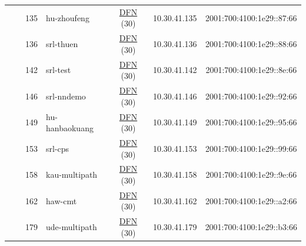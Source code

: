 \begin{small}
\begin{center}
\begin{longtable}{|c|c|c|c|c|c|c|c|}
  &  & \tiny{135} & \multicolumn{1}{|l|}{\tiny{hu-zhoufeng}} & \multicolumn{2}{|c|}{\tiny{\href{https://www.dfn.de}{DFN} (30)}} & \tiny{10.30.41.135} & \tiny{2001:700:4100:1e29::87:66} \\* \cline{3-3}\cline{4-4}\cline{5-5}\cline{6-6}\cline{7-7}\cline{8-8}
  &  & \tiny{136} & \multicolumn{1}{|l|}{\tiny{srl-thuen}} & \multicolumn{2}{|c|}{\tiny{\href{https://www.dfn.de}{DFN} (30)}} & \tiny{10.30.41.136} & \tiny{2001:700:4100:1e29::88:66} \\* \cline{3-3}\cline{4-4}\cline{5-5}\cline{6-6}\cline{7-7}\cline{8-8}
  &  & \tiny{142} & \multicolumn{1}{|l|}{\tiny{srl-test}} & \multicolumn{2}{|c|}{\tiny{\href{https://www.dfn.de}{DFN} (30)}} & \tiny{10.30.41.142} & \tiny{2001:700:4100:1e29::8e:66} \\* \cline{3-3}\cline{4-4}\cline{5-5}\cline{6-6}\cline{7-7}\cline{8-8}
  &  & \tiny{146} & \multicolumn{1}{|l|}{\tiny{srl-nndemo}} & \multicolumn{2}{|c|}{\tiny{\href{https://www.dfn.de}{DFN} (30)}} & \tiny{10.30.41.146} & \tiny{2001:700:4100:1e29::92:66} \\* \cline{3-3}\cline{4-4}\cline{5-5}\cline{6-6}\cline{7-7}\cline{8-8}
  &  & \tiny{149} & \multicolumn{1}{|l|}{\tiny{hu-hanbaokuang}} & \multicolumn{2}{|c|}{\tiny{\href{https://www.dfn.de}{DFN} (30)}} & \tiny{10.30.41.149} & \tiny{2001:700:4100:1e29::95:66} \\* \cline{3-3}\cline{4-4}\cline{5-5}\cline{6-6}\cline{7-7}\cline{8-8}
  &  & \tiny{153} & \multicolumn{1}{|l|}{\tiny{srl-cps}} & \multicolumn{2}{|c|}{\tiny{\href{https://www.dfn.de}{DFN} (30)}} & \tiny{10.30.41.153} & \tiny{2001:700:4100:1e29::99:66} \\* \cline{3-3}\cline{4-4}\cline{5-5}\cline{6-6}\cline{7-7}\cline{8-8}
  &  & \tiny{158} & \multicolumn{1}{|l|}{\tiny{kau-multipath}} & \multicolumn{2}{|c|}{\tiny{\href{https://www.dfn.de}{DFN} (30)}} & \tiny{10.30.41.158} & \tiny{2001:700:4100:1e29::9e:66} \\* \cline{3-3}\cline{4-4}\cline{5-5}\cline{6-6}\cline{7-7}\cline{8-8}
  &  & \tiny{162} & \multicolumn{1}{|l|}{\tiny{haw-cmt}} & \multicolumn{2}{|c|}{\tiny{\href{https://www.dfn.de}{DFN} (30)}} & \tiny{10.30.41.162} & \tiny{2001:700:4100:1e29::a2:66} \\* \cline{3-3}\cline{4-4}\cline{5-5}\cline{6-6}\cline{7-7}\cline{8-8}
  &  & \tiny{179} & \multicolumn{1}{|l|}{\tiny{ude-multipath}} & \multicolumn{2}{|c|}{\tiny{\href{https://www.dfn.de}{DFN} (30)}} & \tiny{10.30.41.179} & \tiny{2001:700:4100:1e29::b3:66} \\ \hline
\end{longtable}
\end{center}
\end{small}



